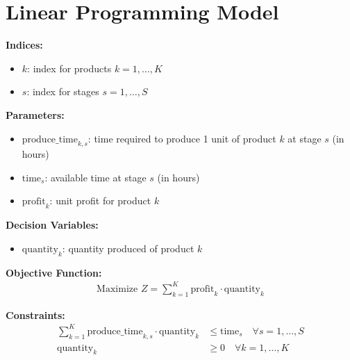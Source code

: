 \documentclass{article}
\begin{document}
\section*{Linear Programming Model}

\textbf{Indices:}
\begin{itemize}
    \item \( k \): index for products \( k = 1, \ldots, K \)
    \item \( s \): index for stages \( s = 1, \ldots, S \)
\end{itemize}

\textbf{Parameters:}
\begin{itemize}
    \item \( \text{produce\_time}_{k,s} \): time required to produce 1 unit of product \( k \) at stage \( s \) (in hours)
    \item \( \text{time}_{s} \): available time at stage \( s \) (in hours)
    \item \( \text{profit}_{k} \): unit profit for product \( k \)
\end{itemize}

\textbf{Decision Variables:}
\begin{itemize}
    \item \( \text{quantity}_{k} \): quantity produced of product \( k \)
\end{itemize}

\textbf{Objective Function:}
\begin{align*}
    \text{Maximize } Z = \sum_{k=1}^{K} \text{profit}_{k} \cdot \text{quantity}_{k}
\end{align*}

\textbf{Constraints:}
\begin{align*}
    \sum_{k=1}^{K} \text{produce\_time}_{k,s} \cdot \text{quantity}_{k} & \leq \text{time}_{s} \quad \forall s = 1, \ldots, S \\
    \text{quantity}_{k} & \geq 0 \quad \forall k = 1, \ldots, K
\end{align*}
\end{document}
